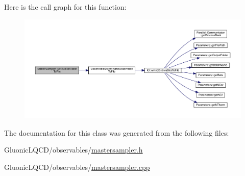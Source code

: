 Here is the call graph for this function\+:\nopagebreak
\begin{figure}[H]
\begin{center}
\leavevmode
\includegraphics[width=350pt]{class_master_sampler_a638714c38e1a6252ab8b6be1fa224bd4_cgraph}
\end{center}
\end{figure}


The documentation for this class was generated from the following files\+:\begin{DoxyCompactItemize}
\item 
Gluonic\+L\+Q\+C\+D/observables/\mbox{\hyperlink{mastersampler_8h}{mastersampler.\+h}}\item 
Gluonic\+L\+Q\+C\+D/observables/\mbox{\hyperlink{mastersampler_8cpp}{mastersampler.\+cpp}}\end{DoxyCompactItemize}

